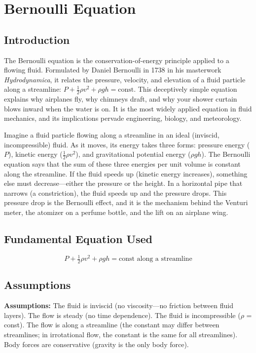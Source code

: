 \chapter{Bernoulli Equation}

\section*{Introduction}

The Bernoulli equation is the conservation-of-energy principle applied to a flowing fluid. Formulated by Daniel Bernoulli in 1738 in his masterwork \textit{Hydrodynamica}, it relates the pressure, velocity, and elevation of a fluid particle along a streamline: $P + \frac{1}{2}\rho v^2 + \rho gh = \text{const}$. This deceptively simple equation explains why airplanes fly, why chimneys draft, and why your shower curtain blows inward when the water is on. It is the most widely applied equation in fluid mechanics, and its implications pervade engineering, biology, and meteorology.

Imagine a fluid particle flowing along a streamline in an ideal (inviscid, incompressible) fluid. As it moves, its energy takes three forms: pressure energy ($P$), kinetic energy ($\frac{1}{2}\rho v^2$), and gravitational potential energy ($\rho gh$). The Bernoulli equation says that the sum of these three energies per unit volume is constant along the streamline. If the fluid speeds up (kinetic energy increases), something else must decrease---either the pressure or the height. In a horizontal pipe that narrows (a constriction), the fluid speeds up and the pressure drops. This pressure drop is the Bernoulli effect, and it is the mechanism behind the Venturi meter, the atomizer on a perfume bottle, and the lift on an airplane wing.
\section*{Fundamental Equation Used}

\begin{equation}
P + \tfrac{1}{2}\rho v^2 + \rho gh = \text{const along a streamline}
\end{equation}
\section*{Assumptions}

\textbf{Assumptions:} The fluid is inviscid (no viscosity---no friction between fluid layers). The flow is steady (no time dependence). The fluid is incompressible ($\rho$ = const). The flow is along a streamline (the constant may differ between streamlines; in irrotational flow, the constant is the same for all streamlines). Body forces are conservative (gravity is the only body force).


